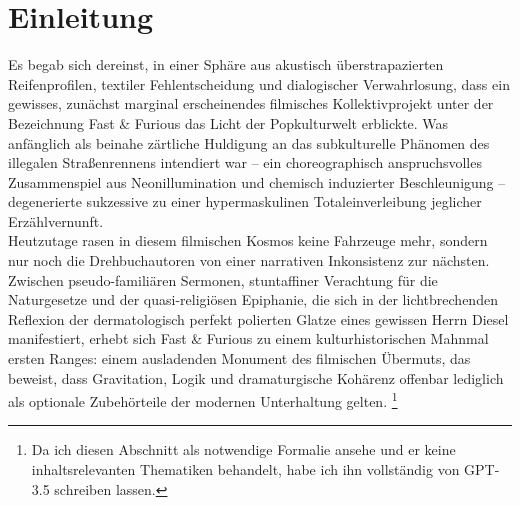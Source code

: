 \section{Einleitung}

Es begab sich dereinst, in einer Sphäre aus akustisch überstrapazierten Reifenprofilen, textiler Fehlentscheidung und dialogischer Verwahrlosung, dass ein gewisses, zunächst marginal erscheinendes filmisches Kollektivprojekt unter der Bezeichnung Fast \& Furious das Licht der Popkulturwelt erblickte. Was anfänglich als beinahe zärtliche Huldigung an das subkulturelle Phänomen des illegalen Straßenrennens intendiert war – ein choreographisch anspruchsvolles Zusammenspiel aus Neonillumination und chemisch induzierter Beschleunigung – degenerierte sukzessive zu einer hypermaskulinen Totaleinverleibung jeglicher Erzählvernunft.
\\
Heutzutage rasen in diesem filmischen Kosmos keine Fahrzeuge mehr, sondern nur noch die Drehbuchautoren von einer narrativen Inkonsistenz zur nächsten. Zwischen pseudo-familiären Sermonen, stuntaffiner Verachtung für die Naturgesetze und der quasi-religiösen Epiphanie, die sich in der lichtbrechenden Reflexion der dermatologisch perfekt polierten Glatze eines gewissen Herrn Diesel manifestiert, erhebt sich Fast \& Furious zu einem kulturhistorischen Mahnmal ersten Ranges: einem ausladenden Monument des filmischen Übermuts, das beweist, dass Gravitation, Logik und dramaturgische Kohärenz offenbar lediglich als optionale Zubehörteile der modernen Unterhaltung gelten.
\footnote{Da ich diesen Abschnitt als notwendige Formalie ansehe und er keine inhaltsrelevanten Thematiken behandelt, habe ich ihn vollständig von GPT-3.5 schreiben lassen.}

